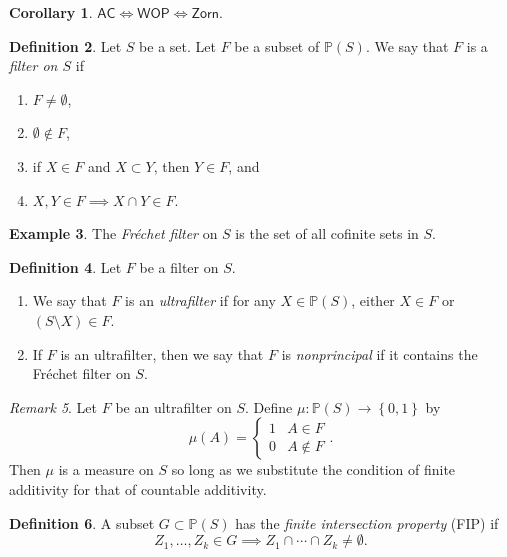 \documentclass[10pt,letterpaper,cm]{nupset}
\theoremstyle{definition}
\newtheorem{definition}{Definition}[subsection]
\newtheorem{exmp}[definition]{Example}
\theoremstyle{theorem}
\newtheorem{corollary}[definition]{Corollary}
\theoremstyle{remark}
\newtheorem{remark}[definition]{Remark}
\renewcommand{\P}{\mathbb P}
\newcommand{\1}{\mathbf{1}}
\newcommand{\0}{\vec 0}
\newcommand{\ac}{\mathsf{AC}}
\begin{document}
\begin{corollary}
$\ac \iff \mathsf{WOP} \iff \mathsf{Zorn}$.
\end{corollary}

\begin{definition} Let $S$ be a set. Let $F$ be a subset of $\P(S)$. We say that $F$  is a \textit{filter on $S$} if
\begin{enumerate}[label=(\alph*)]
\item $F\ne \emptyset$,
\item $\emptyset \notin F$,
\item if $X \in F$ and $X \subset Y$, then $Y \in F$, and
\item $X,Y \in F \implies X \cap Y \in F$.
\end{enumerate}
\end{definition}

\begin{exmp}
The \textit{Fr\'echet filter} on $S$ is the set of all cofinite sets in $S$.
\end{exmp}

\begin{definition}  Let $F$ be a filter on $S$.
\begin{enumerate}
\item We say that $F$ is an \textit{ultrafilter} if for any $X \in \P(S)$, either $X \in F$ or $\left(S \setminus X\right) \in F$.
\item If $F$ is an ultrafilter, then we say that $F$ is \textit{nonprincipal} if it contains the Fr\'echet filter on $S$.
\end{enumerate} 
\end{definition}

\begin{remark}
Let $F$ be an ultrafilter on $S$. Define $\mu : \P(S) \to \left\{0, 1\right\}$ by $$\mu(A) =\begin{cases} 1 & A \in F \\ 0 & A \notin F \end{cases} .$$ Then $\mu$ is a measure on $S$ so long as we substitute the condition of finite additivity for that of countable additivity.    
\end{remark}

\begin{definition}
A subset $G\subset \P(S)$ has the \textit{finite intersection property} (FIP) if $$Z_1, \ldots, Z_k \in G \implies Z_1 \cap \cdots \cap Z_k \ne \emptyset.$$
\end{definition}
\end{document}
